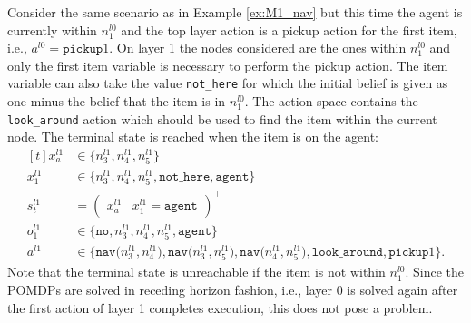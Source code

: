 \begin{example}
Consider the same scenario as in Example \ref{ex:M1_nav} but this time the agent is currently within $n_1^{l0}$ and the top layer action is a pickup action for the first item, i.e., $a^{l0}=\texttt{pickup}1$. On layer 1 the nodes considered are the ones within $n_1^{l0}$ and only the first item variable is necessary to perform the pickup action. The item variable can also take the value \texttt{not\_here} for which the initial belief is given as one minus the belief that the item is in $n_1^{l0}$. The action space contains the \texttt{look\_around} action which should be used to find the item within the current node. The terminal state is reached when the item is on the agent:
\begin{equation}
    \begin{aligned}[t] 
        x_a^{l1} &\in \big\{ n_3^{l1}, n_4^{l1}, n_5^{l1} \big\} \\
        x_1^{l1} &\in  \big\{ n_3^{l1}, n_4^{l1}, n_5^{l1}, \texttt{not\_here}, \texttt{agent} \big\}\\
         s_t^{l1} &= \begin{pmatrix} x_a^{l1} & x_1^{l1}=\texttt{agent} \end{pmatrix}^\intercal\\
        o_1^{l1} &\in \big\{\texttt{no},n_3^{l1}, n_4^{l1}, n_5^{l1}, \texttt{agent} \big\}\\
        a^{l1} &\in \big\{\texttt{nav($n_3^{l1}, n_4^{l1}$)}, \texttt{nav($n_3^{l1}, n_5^{l1}$)}, \texttt{nav($n_4^{l1}, n_5^{l1}$)}, \texttt{look\_around}, \texttt{pickup}1 \big\}.
        \end{aligned}
\end{equation}
 Note that the terminal state is unreachable if the item is not within $n_1^{l0}$. Since the POMDPs are solved in receding horizon fashion, i.e., layer 0 is solved again after the first action of layer 1 completes execution, this does not pose a problem.
 \demo
\end{example}

